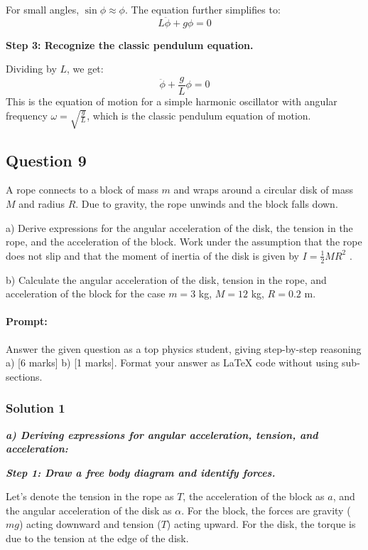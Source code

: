 \documentclass{article}
\begin{document}
For small angles, $\sin \phi \approx \phi$. The equation further simplifies to:
$$L \ddot{\phi} + g \phi = 0$$

\textbf{Step 3: Recognize the classic pendulum equation.}

Dividing by $L$, we get:
$$\ddot{\phi} + \frac{g}{L} \phi = 0$$
This is the equation of motion for a simple harmonic oscillator with angular frequency $\omega = \sqrt{\frac{g}{L}}$, which is the classic pendulum equation of motion.


\subsection{Question 9}
A rope connects to a block of mass $m$ and wraps around a circular disk of mass $M$ and radius $R$.
Due to gravity, the rope unwinds and the block falls down.

a) Derive expressions for the angular acceleration of the disk, the tension in the rope, and the
acceleration of the block. Work under the assumption that the rope does not slip and that the
moment of inertia of the disk is given by \(I=\frac{1}{2}MR^{2}\) .

b) Calculate the angular acceleration of the disk, tension in the rope, and acceleration of the block
for the case \(m=3\) kg, \(M=12\) kg, \(R=0.2\) m.

\paragraph{Prompt: \\} 
Answer the given question as a top physics student, giving step-by-step reasoning a) [6 marks] b) [1 marks]. Format your answer as LaTeX code without using sub-sections.

\subsubsection{Solution 1}

\textit{\textbf{a) Deriving expressions for angular acceleration, tension, and acceleration:}}

\textit{\textbf{Step 1: Draw a free body diagram and identify forces.}}

Let's denote the tension in the rope as $T$, the acceleration of the block as $a$, and the angular acceleration of the disk as $\alpha$. For the block, the forces are gravity ($mg$) acting downward and tension ($T$) acting upward. For the disk, the torque is due to the tension at the edge of the disk.
\end{document}
